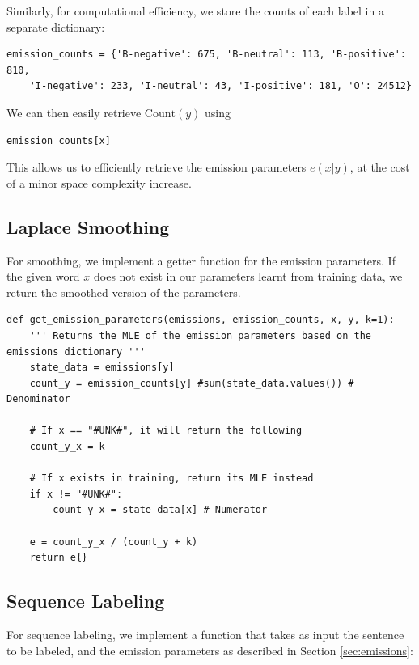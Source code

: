 \documentclass{article}
\numberwithin{equation}{section}
\begin{document}
Similarly, for computational efficiency, we store the counts of each label in a separate dictionary:

\begin{verbatim}
emission_counts = {'B-negative': 675, 'B-neutral': 113, 'B-positive': 810,
    'I-negative': 233, 'I-neutral': 43, 'I-positive': 181, 'O': 24512}
\end{verbatim}

We can then easily retrieve $\text{Count}(y)$ using

\begin{verbatim}emission_counts[x]\end{verbatim}

This allows us to efficiently retrieve the emission parameters $e(x|y)$, at the cost of a minor space complexity increase.

\subsection{Laplace Smoothing}

For smoothing, we implement a getter function for the emission parameters. If the given word $x$ does not exist in our parameters learnt from training data, we return the smoothed version of the parameters.

\begin{verbatim}
def get_emission_parameters(emissions, emission_counts, x, y, k=1):
    ''' Returns the MLE of the emission parameters based on the emissions dictionary '''
    state_data = emissions[y]
    count_y = emission_counts[y] #sum(state_data.values()) # Denominator

    # If x == "#UNK#", it will return the following
    count_y_x = k

    # If x exists in training, return its MLE instead
    if x != "#UNK#":
        count_y_x = state_data[x] # Numerator

    e = count_y_x / (count_y + k)
    return e{}
\end{verbatim}

\subsection{Sequence Labeling}

For sequence labeling, we implement a function that takes as input the sentence to be labeled, and the emission parameters as described in Section \ref{sec:emissions}:
\end{document}
